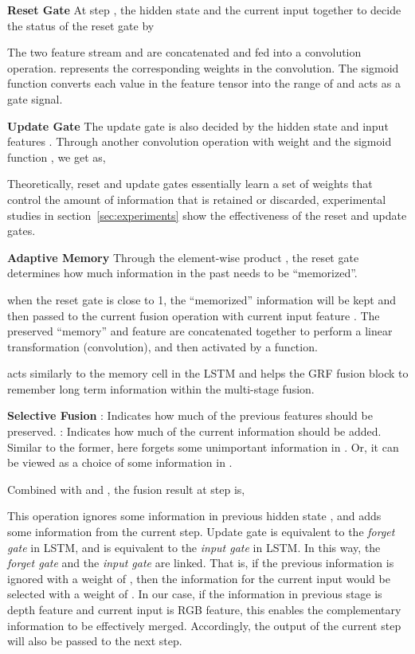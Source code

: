\documentclass[10pt,twocolumn,letterpaper]{article}
\begin{document}
\noindent
\textbf{Reset Gate}
At step , the hidden state  and the current input  together to decide the status of the reset gate  by


The two feature stream  and  are concatenated and fed into a convolution operation.  represents the corresponding weights in the convolution.
The sigmoid function  converts each value in the feature tensor into the range of  and acts as a gate signal.

\noindent
\textbf{Update Gate}
The update gate  is also decided by the hidden state  and input features .
Through another convolution operation with weight  and the sigmoid function , we get  as,


Theoretically, reset and update gates essentially learn a set of weights that control the amount of information that is retained or discarded, 
experimental studies in section~\ref{sec:experiments} show the effectiveness of the reset and update gates.

\noindent
\textbf{Adaptive Memory}
Through the element-wise product , the reset gate  determines how much information in the past needs to be ``memorized''.

when the reset gate  is close to 1, the ``memorized'' information  will be kept and then passed to the current fusion operation with current input feature .
The preserved ``memory''  and feature  are concatenated together to perform a linear transformation (convolution), and then activated by a  function.

 acts similarly to the memory cell in the LSTM and helps the GRF fusion block to remember long term information within the multi-stage fusion.

\noindent
\textbf{Selective Fusion}
 :
Indicates how much of the previous features should be preserved.
: Indicates how much of the current information  should be added. Similar to the former, here  forgets some unimportant information in . Or, it can be viewed as a choice of some information in .


Combined with  and , the fusion result at step  is,

This operation ignores some information in previous hidden state , and adds some information from the current step.
Update gate  is equivalent to the \textit{forget gate} in LSTM, and  is equivalent to the \textit{input gate} in LSTM. In this way, the \textit{forget gate}  and the \textit{input gate}  are linked. 
That is, if the previous information is ignored with a weight of , then the information for the current input  would be selected with a weight of . In our case,
if the information in previous stage is depth feature and current input is RGB feature, this enables the complementary information to be effectively merged. Accordingly, the output of the current step  will also be passed to the next step.
\end{document}
